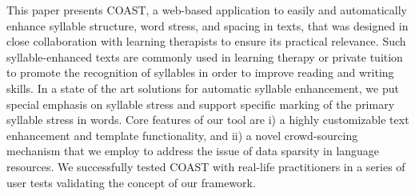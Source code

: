 This paper presents COAST, a web-based application to easily and automatically enhance syllable structure, word stress, and spacing in texts, that was designed in close collaboration with learning therapists to ensure its practical relevance. Such syllable-enhanced texts are commonly used in learning therapy or private tuition to promote the recognition of syllables in order to improve reading and writing skills. In a state of the art solutions for automatic syllable enhancement, we put special emphasis on syllable stress and support specific marking of the primary syllable stress in words.  Core features of our tool are i) a highly customizable text enhancement and template functionality, and ii) a novel crowd-sourcing mechanism that we employ to address the issue of data sparsity in language resources. We successfully tested COAST with real-life practitioners in a series of user tests validating the concept of our framework.
